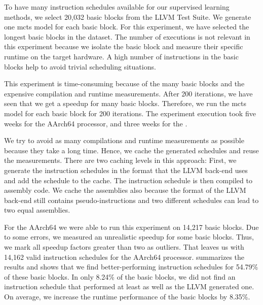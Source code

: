 
To have many instruction schedules available for our supervised learning methods, we select 20,032 basic blocks from the LLVM Test Suite.
We generate one \ac{mcts} model for each basic block.
For this experiment, we have selected the longest basic blocks in the dataset.
The number of executions is not relevant in this experiment because we isolate the basic block and measure their specific runtime on the target hardware.
A high number of instructions in the basic blocks help to avoid trivial scheduling situations.

This experiment is time-consuming because of the many basic blocks and the expensive compilation and runtime measurements.
After 200 iterations, we have seen that we get a speedup for many basic blocks.
Therefore, we run the \ac{mcts} model for each basic block for 200 iterations.
The experiment execution took five weeks for the AArch64 processor, and three weeks for the \aurora{}.


We try to avoid as many compilations and runtime measurements as possible because they take a long time.
Hence, we cache the generated schedules and reuse the measurements.
There are two caching levels in this approach:
First, we generate the instruction schedules in the format that the LLVM back-end uses and add the schedule to the cache.
The instruction schedule is then compiled to assembly code.
We cache the assemblies also because the format of the LLVM back-end still contains pseudo-instructions and two different schedules can lead to two equal assemblies.

For the AArch64 we were able to run this experiment on 14,217 basic blocks.
Due to some errors, we measured an unrealistic speedup for some basic blocks.
Thus, we mark all speedup factors greater than two as outliers.
That leaves us with 14,162 valid instruction schedules for the AArch64 processor.
 summarizes the results and shows that we find better-performing instruction schedules for 54.79\% of these basic blocks.
In only 8.24\% of the basic blocks, we did not find an instruction schedule that performed at least as well as the LLVM generated one.
On average, we increase the runtime performance of the basic blocks by 8.35\%.

